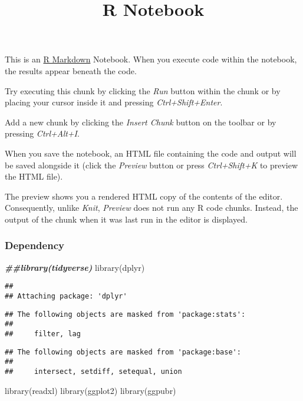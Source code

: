 \documentclass[
]{article}
\title{R Notebook}
\author{}
\date{\vspace{-2.5em}}
\newenvironment{Shaded}{\begin{snugshade}}{\end{snugshade}}
\newcommand{\DocumentationTok}[1]{\textcolor[rgb]{0.56,0.35,0.01}{\textbf{\textit{#1}}}}
\newcommand{\FunctionTok}[1]{\textcolor[rgb]{0.00,0.00,0.00}{#1}}
\newcommand{\NormalTok}[1]{#1}
\begin{document}
\maketitle

This is an \href{http://rmarkdown.rstudio.com}{R Markdown} Notebook.
When you execute code within the notebook, the results appear beneath
the code.

Try executing this chunk by clicking the \emph{Run} button within the
chunk or by placing your cursor inside it and pressing
\emph{Ctrl+Shift+Enter}.

Add a new chunk by clicking the \emph{Insert Chunk} button on the
toolbar or by pressing \emph{Ctrl+Alt+I}.

When you save the notebook, an HTML file containing the code and output
will be saved alongside it (click the \emph{Preview} button or press
\emph{Ctrl+Shift+K} to preview the HTML file).

The preview shows you a rendered HTML copy of the contents of the
editor. Consequently, unlike \emph{Knit}, \emph{Preview} does not run
any R code chunks. Instead, the output of the chunk when it was last run
in the editor is displayed.

\hypertarget{dependency}{%
\subsubsection{Dependency}\label{dependency}}

\begin{Shaded}
\begin{Highlighting}[]
\DocumentationTok{\#\#library(tidyverse)}
\FunctionTok{library}\NormalTok{(dplyr)}
\end{Highlighting}
\end{Shaded}

\begin{verbatim}
## 
## Attaching package: 'dplyr'
\end{verbatim}

\begin{verbatim}
## The following objects are masked from 'package:stats':
## 
##     filter, lag
\end{verbatim}

\begin{verbatim}
## The following objects are masked from 'package:base':
## 
##     intersect, setdiff, setequal, union
\end{verbatim}

\begin{Shaded}
\begin{Highlighting}[]
\FunctionTok{library}\NormalTok{(readxl)}
\FunctionTok{library}\NormalTok{(ggplot2)}
\FunctionTok{library}\NormalTok{(ggpubr)}
\end{Highlighting}
\end{Shaded}
\end{document}
